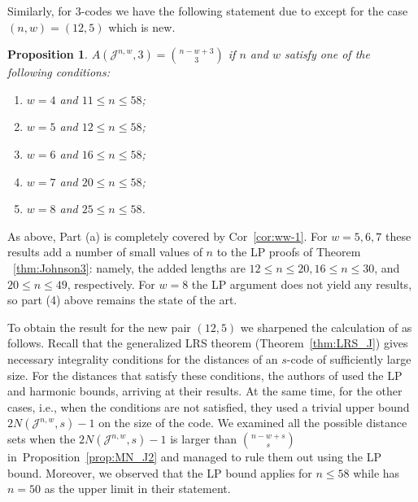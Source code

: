 \documentclass{amsart}
\newtheorem{propositionenv}[definitionenv]{Proposition}
\newenvironment{proposition}{\begin{propositionenv}\rm}{\end{propositionenv}}
\newcommand{\cJ}{\mathcal{J}}
\begin{document}
Similarly, for $3$-codes we have the following statement due to \cite{MN11} except for the case $(n, w) = (12, 5)$ which is new.

\begin{proposition}
\label{prop:3_dis_equal_J}
$A(\cJ^{n, w}, 3) = \binom{n-w+3}{3}$ if $n$ and $w$ satisfy one of the following conditions:
\begin{enumerate}
    \item
    $w=4$ and $11 \leq n \leq {58}$;
    \item
    $w=5$ and $12 \leq n \leq {58}$;
    \item
    $w=6$ and $16\le n\le {58}$;
    \item
    $w=7$ and $20\le n\le {58}$;
    \item
    $w=8$ and $25 \leq n \leq {58}$.
\end{enumerate}
\end{proposition}
As above, Part (a) is completely covered by Cor~\ref{cor:ww-1}. 
For $w=5,6,7$ these results add a number of small values of $n$ to the LP proofs of Theorem ~\ref{thm:Johnson3}: namely, the added lengths are $12\le n\le 20, 16\le n\le 30$, and $20\le n\le 49$, respectively. For $w=8$ the
LP argument does not yield any results, so part (4) above remains the state of the art.

To obtain the result for the new pair $(12,5)$ we sharpened the calculation of \cite{MN11} as follows. Recall that the generalized LRS theorem (Theorem~\ref{thm:LRS_J}) gives necessary integrality conditions for the distances of an $s$-code of sufficiently large size.  For the distances that satisfy these conditions, the authors of \cite{MN11} used the LP and harmonic bounds, arriving at their results. At the same time, for the other cases, i.e., when the conditions are
not satisfied, they used a trivial upper bound $2N(\cJ^{n,w},s)-1$ on the size of the code. We examined all the possible distance sets when the  $2N(\cJ^{n,w},s)-1$ is larger than $\binom{n-w+s}{s}$ in~Proposition~\ref{prop:MN_J2} and managed to rule them out using the LP bound. Moreover, we observed that the LP bound
applies for $n\le 58$ while \cite{MN11} has $n=50$ as the upper limit in their
statement.
\end{document}
